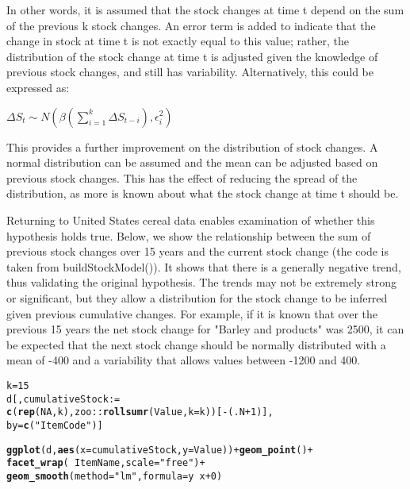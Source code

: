 \documentclass[nojss]{jss}\usepackage[]{graphicx}\usepackage[]{color}
\makeatletter
\newcommand{\hlnum}[1]{\textcolor[rgb]{0.686,0.059,0.569}{#1}}%
\newcommand{\hlstr}[1]{\textcolor[rgb]{0.192,0.494,0.8}{#1}}%
\newcommand{\hlopt}[1]{\textcolor[rgb]{0,0,0}{#1}}%
\newcommand{\hlstd}[1]{\textcolor[rgb]{0.345,0.345,0.345}{#1}}%
\newcommand{\hlkwb}[1]{\textcolor[rgb]{0.69,0.353,0.396}{#1}}%
\newcommand{\hlkwc}[1]{\textcolor[rgb]{0.333,0.667,0.333}{#1}}%
\newcommand{\hlkwd}[1]{\textcolor[rgb]{0.737,0.353,0.396}{\textbf{#1}}}%
\newenvironment{kframe}{%
 \def\at@end@of@kframe{}%
 \ifinner\ifhmode%
  \def\at@end@of@kframe{\end{minipage}}%
  \begin{minipage}{\columnwidth}%
 \fi\fi%
 \def\FrameCommand##1{\hskip\@totalleftmargin \hskip-\fboxsep
 \colorbox{shadecolor}{##1}\hskip-\fboxsep
     \hskip-\linewidth \hskip-\@totalleftmargin \hskip\columnwidth}%
 \MakeFramed {\advance\hsize-\width
   \@totalleftmargin\z@ \linewidth\hsize
   \@setminipage}}%
 {\par\unskip\endMakeFramed%
 \at@end@of@kframe}
\newenvironment{knitrout}{}{} %
\makeatother
\begin{document}
In other words, it is assumed that the stock changes at time t depend on the sum of the previous k stock changes. An error term is added to indicate that the change in stock at time t is not exactly equal to this value; rather, the distribution of the stock change at time t is adjusted given the knowledge of previous stock changes, and still has variability. Alternatively, this could be expressed as:

$\Delta S_t \sim N(\beta \left(\sum_{i = 1}^k \Delta S_{t-i} \right), \epsilon_i^2)$

This provides a further improvement on the distribution of stock changes. A normal distribution can be assumed and the mean can be adjusted based on previous stock changes. This has the effect of reducing the spread of the distribution, as more is known about what the stock change at time t should be.

Returning to United States cereal data enables examination of whether this hypothesis holds true. Below, we show the relationship between the sum of previous stock changes over 15 years and the current stock change (the code is taken from buildStockModel()).  It shows that there is a generally negative trend, thus validating the original hypothesis. The trends may not be extremely strong or significant, but they allow a distribution for the stock change to be inferred given previous cumulative changes. For example, if it is known that over the previous 15 years the net stock change for "Barley and products" was 2500, it can be expected that the next stock change should be normally distributed with a mean of -400 and a variability that allows values between -1200 and 400.

\begin{knitrout}
\color{fgcolor}\begin{kframe}
\begin{alltt}
\hlstd{k} \hlkwb{=} \hlnum{15}
\hlstd{d[, cumulativeStock} \hlkwb{:=}
      \hlkwd{c}\hlstd{(}\hlkwd{rep}\hlstd{(}\hlnum{NA}\hlstd{, k), zoo}\hlopt{::}\hlkwd{rollsumr}\hlstd{(Value,} \hlkwc{k} \hlstd{= k))[}\hlopt{-}\hlstd{(.N}\hlopt{+}\hlnum{1}\hlstd{)],}
  \hlkwc{by} \hlstd{=} \hlkwd{c}\hlstd{(}\hlstr{"ItemCode"}\hlstd{)]}
\end{alltt}


{\ttfamily\noindent\bfseries\color{errorcolor}{\#\# Error in eval(expr, envir, enclos): object 'd' not found}}\begin{alltt}
\hlkwd{ggplot}\hlstd{(d,} \hlkwd{aes}\hlstd{(}\hlkwc{x} \hlstd{= cumulativeStock,} \hlkwc{y} \hlstd{= Value))} \hlopt{+} \hlkwd{geom_point}\hlstd{()} \hlopt{+}
    \hlkwd{facet_wrap}\hlstd{(} \hlopt{~} \hlstd{ItemName,} \hlkwc{scale} \hlstd{=} \hlstr{"free"}\hlstd{)} \hlopt{+}
    \hlkwd{geom_smooth}\hlstd{(}\hlkwc{method} \hlstd{=} \hlstr{"lm"}\hlstd{,} \hlkwc{formula} \hlstd{= y} \hlopt{~} \hlstd{x} \hlopt{+} \hlnum{0}\hlstd{)}
\end{alltt}


{\ttfamily\noindent\bfseries\color{errorcolor}{\#\# Error in ggplot(d, aes(x = cumulativeStock, y = Value)): object 'd' not found}}\end{kframe}
\end{knitrout}
\end{document}
